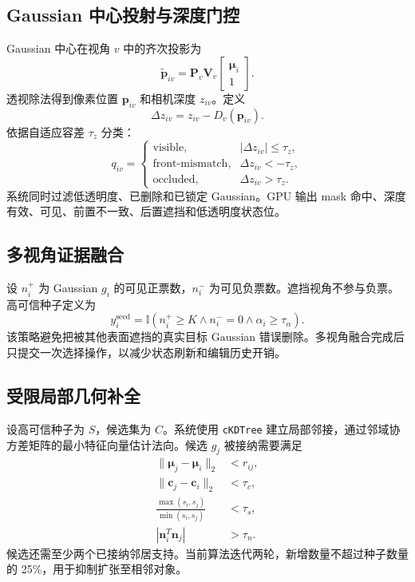 \documentclass[10pt,twocolumn]{ctexart}
\begin{document}
\subsection{Gaussian 中心投射与深度门控}

Gaussian 中心在视角 $v$ 中的齐次投影为
\begin{equation}
\tilde{\mathbf{p}}_{iv}=\mathbf{P}_v\mathbf{V}_v
\begin{bmatrix}\bm{\mu}_i\\1\end{bmatrix}.
\end{equation}
透视除法得到像素位置 $\mathbf{p}_{iv}$ 和相机深度 $z_{iv}$。定义
\begin{equation}
\Delta z_{iv}=z_{iv}-D_v(\mathbf{p}_{iv}).
\end{equation}
依据自适应容差 $\tau_z$ 分类：
\begin{equation}
q_{iv}=\begin{cases}
\text{visible}, & |\Delta z_{iv}|\leq\tau_z,\\
\text{front-mismatch}, & \Delta z_{iv}< -\tau_z,\\
\text{occluded}, & \Delta z_{iv}>\tau_z.
\end{cases}
\end{equation}
系统同时过滤低透明度、已删除和已锁定 Gaussian。GPU 输出 mask 命中、深度有效、可见、前置不一致、后置遮挡和低透明度状态位。

\subsection{多视角证据融合}

设 $n_i^+$ 为 Gaussian $g_i$ 的可见正票数，$n_i^-$ 为可见负票数。遮挡视角不参与负票。高可信种子定义为
\begin{equation}
y_i^{\mathrm{seed}}=
\mathbb{I}(n_i^+\geq K\land n_i^-=0\land\alpha_i\geq\tau_\alpha).
\end{equation}
该策略避免把被其他表面遮挡的真实目标 Gaussian 错误删除。多视角融合完成后只提交一次选择操作，以减少状态刷新和编辑历史开销。

\subsection{受限局部几何补全}

设高可信种子为 $S$，候选集为 $C$。系统使用 \texttt{cKDTree} 建立局部邻接，通过邻域协方差矩阵的最小特征向量估计法向。候选 $g_j$ 被接纳需要满足
\begin{align}
\|\bm{\mu}_j-\bm{\mu}_i\|_2 &< r_{ij},\\
\|\mathbf{c}_j-\mathbf{c}_i\|_2 &< \tau_c,\\
\frac{\max(s_i,s_j)}{\min(s_i,s_j)} &< \tau_s,\\
|\mathbf{n}_i^T\mathbf{n}_j| &> \tau_n.
\end{align}
候选还需至少两个已接纳邻居支持。当前算法迭代两轮，新增数量不超过种子数量的 25\%，用于抑制扩张至相邻对象。
\end{document}

